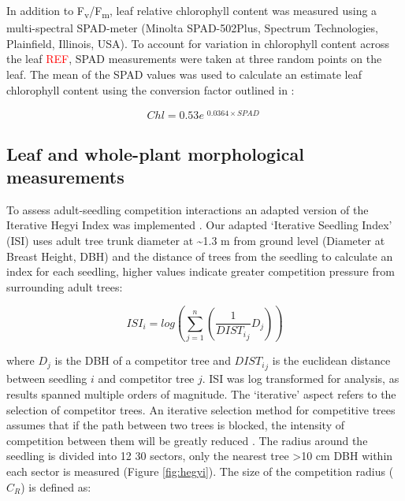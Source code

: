 \documentclass[a4paper,11pt]{article}
\newcommand{\todo}[1]{\textcolor{red}{#1}}   %
\begin{document}
In addition to F\textsubscript{v}/F\textsubscript{m}, leaf relative chlorophyll content was measured using a multi-spectral SPAD-meter (Minolta SPAD-502Plus, Spectrum Technologies, Plainfield, Illinois, USA). To account for variation in chlorophyll content across the leaf \todo{REF}, SPAD measurements were taken at three random points on the leaf. The mean of the SPAD values was used to calculate an estimate leaf chlorophyll content using the conversion factor outlined in \citep{}:

\begin{equation} \label{eq:chl-spad}
Chl = 0.53e^{\begin{matrix} 0.0364 \times SPAD \end{matrix}}
\end{equation}


\subsection{Leaf and whole-plant morphological measurements}

To assess adult-seedling competition interactions an adapted version of the Iterative Hegyi Index was implemented \citep{Hegyi1974, Lee2004, Seifert2014}. Our adapted `Iterative Seedling Index' (ISI) uses adult tree trunk diameter at \textasciitilde 1.3 m from ground level (Diameter at Breast Height, DBH) and the distance of trees from the seedling to calculate an index for each seedling, higher values indicate greater competition pressure from surrounding adult trees:

\begin{equation}
\label{eq:ISI}
ISI_i = log(\sum_{j=1}^n (\frac{1}{{DIST_i}_j} D_j))
\end{equation}

where $D_j$ is the DBH of a competitor tree and ${{DIST_i}_j}$ is the euclidean distance between seedling $i$ and competitor tree $j$. ISI was log transformed for analysis, as results spanned multiple orders of magnitude. The `iterative' aspect refers to the selection of competitor trees. An iterative selection method for competitive trees assumes that if the path between two trees is blocked, the intensity of competition between them will be greatly reduced \citep{Gadow1999}. The radius around the seedling is divided into 12 30\textdegree{} sectors, only the nearest tree \textgreater{}10 cm DBH within each sector is measured (Figure \ref{fig:hegyi}). The size of the competition radius ($C_R$) is defined as:
\end{document}
